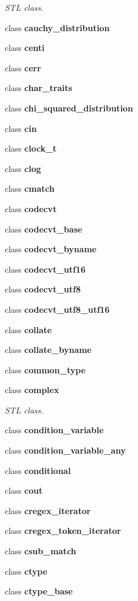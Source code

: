 \begin{DoxyCompactItemize}
\begin{DoxyCompactList}\small\item\em S\+TL class. \end{DoxyCompactList}\item 
class \textbf{ cauchy\+\_\+distribution}
\item 
class \textbf{ centi}
\item 
class \textbf{ cerr}
\item 
class \textbf{ char\+\_\+traits}
\item 
class \textbf{ chi\+\_\+squared\+\_\+distribution}
\item 
class \textbf{ cin}
\item 
class \textbf{ clock\+\_\+t}
\item 
class \textbf{ clog}
\item 
class \textbf{ cmatch}
\item 
class \textbf{ codecvt}
\item 
class \textbf{ codecvt\+\_\+base}
\item 
class \textbf{ codecvt\+\_\+byname}
\item 
class \textbf{ codecvt\+\_\+utf16}
\item 
class \textbf{ codecvt\+\_\+utf8}
\item 
class \textbf{ codecvt\+\_\+utf8\+\_\+utf16}
\item 
class \textbf{ collate}
\item 
class \textbf{ collate\+\_\+byname}
\item 
class \textbf{ common\+\_\+type}
\item 
class \textbf{ complex}
\begin{DoxyCompactList}\small\item\em S\+TL class. \end{DoxyCompactList}\item 
class \textbf{ condition\+\_\+variable}
\item 
class \textbf{ condition\+\_\+variable\+\_\+any}
\item 
class \textbf{ conditional}
\item 
class \textbf{ cout}
\item 
class \textbf{ cregex\+\_\+iterator}
\item 
class \textbf{ cregex\+\_\+token\+\_\+iterator}
\item 
class \textbf{ csub\+\_\+match}
\item 
class \textbf{ ctype}
\item 
class \textbf{ ctype\+\_\+base}
\item 

\end{DoxyCompactItemize}
